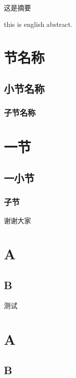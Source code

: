 \documentclass{cczu}
\begin{document}
\cczupage
\frontpage
\begin{cabstract}
	这是摘要
\end{cabstract}
\begin{eabstract}
	this is english abstract.
\end{eabstract}
\ctableofcontents

\mainpage

\section{节名称}
\subsection{小节名称}
\subsubsection{子节名称}
\section{一节}
\subsection{一小节}
\subsubsection{子节}

\thank
谢谢大家

\cappendix
\cpart
\section{A}
\subsection{B}
测试
\cpart
\section{A}
\subsection{B}
\end{document}
